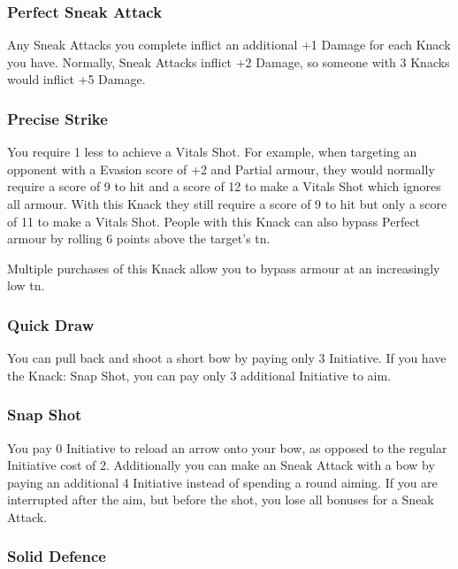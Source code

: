 \begin{multicols}{2}
\subsubsection{Perfect Sneak Attack}

Any Sneak Attacks you complete inflict an additional +1 Damage for each Knack you have. Normally, Sneak Attacks inflict +2 Damage, so someone with 3 Knacks would inflict +5 Damage.

\subsubsection{Precise Strike}\label{precisestrike}

You require 1 less to achieve a Vitals Shot. For example, when targeting an opponent with a Evasion score of +2 and Partial armour, they would normally require a score of 9 to hit and a score of 12 to make a Vitals Shot which ignores all armour. With this Knack they still require a score of 9 to hit but only a score of 11 to make a Vitals Shot. People with this Knack can also bypass Perfect armour by rolling 6 points above the target's \gls{tn}.

Multiple purchases of this Knack allow you to bypass armour at an increasingly low \gls{tn}.

\subsubsection{Quick Draw}

You can pull back and shoot a short bow by paying only 3 Initiative. If you have the Knack: Snap Shot, you can pay only 3 additional Initiative to aim.

\subsubsection{Snap Shot}

You pay 0 Initiative to reload an arrow onto your bow, as opposed to the regular Initiative cost of 2.
Additionally you can make an Sneak Attack with a bow by paying an additional 4 Initiative instead of spending a \gls{round} aiming.
If you are interrupted after the aim, but before the shot, you lose all bonuses for a Sneak Attack.

\subsubsection{Solid Defence}\label{soliddefence}


\end{multicols}
